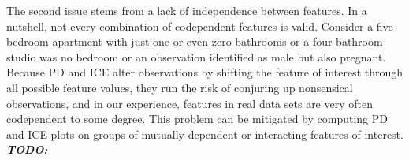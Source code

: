 \documentclass[12pt]{article}
\newcommand{\todo}[1]{{\bf\em TODO:} {{\color{red}{#1}}}}
\begin{document}
The second issue stems from a lack of independence between features.  In a nutshell, not every combination of codependent features is valid. Consider a five bedroom apartment with just one or even zero bathrooms or a four bathroom studio was no bedroom or an observation identified as male but also pregnant.  Because PD and ICE alter observations by shifting the feature of interest through all possible feature values, they run the risk of conjuring up nonsensical observations, and in our experience, features in real data sets are very often codependent to some degree. This problem can be mitigated by computing PD and ICE plots on groups of mutually-dependent or interacting features of interest. \todo{but could involve identifying subsets and computing lots of combinations and we still might want to know about a single contribution.}
\end{document}
